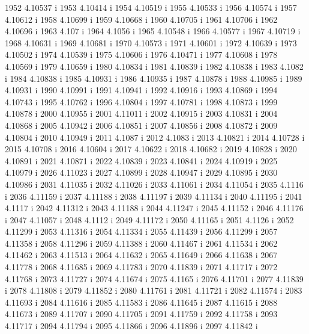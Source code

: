  1952  4.10537  i
 1953  4.10414  i
 1954  4.10519  i
 1955  4.10533  i
 1956  4.10574  i
 1957  4.10612  i
 1958  4.10699  i
 1959  4.10668  i
 1960  4.10705  i
 1961  4.10706  i
 1962  4.10696  i
 1963  4.107  i
 1964  4.1056  i
 1965  4.10548  i
 1966  4.10577  i
 1967  4.10719  i
 1968  4.10631  i
 1969  4.10681  i
 1970  4.10573  i
 1971  4.10601  i
 1972  4.10639  i
 1973  4.10502  i
 1974  4.10539  i
 1975  4.10606  i
 1976  4.10471  i
 1977  4.10608  i
 1978  4.10569  i
 1979  4.10659  i
 1980  4.10834  i
 1981  4.10839  i
 1982  4.10838  i
 1983  4.1082  i
 1984  4.10838  i
 1985  4.10931  i
 1986  4.10935  i
 1987  4.10878  i
 1988  4.10985  i
 1989  4.10931  i
 1990  4.10991  i
 1991  4.10941  i
 1992  4.10916  i
 1993  4.10869  i
 1994  4.10743  i
 1995  4.10762  i
 1996  4.10804  i
 1997  4.10781  i
 1998  4.10873  i
 1999  4.10878  i
 2000  4.10955  i
 2001  4.11011  i
 2002  4.10915  i
 2003  4.10831  i
 2004  4.10868  i
 2005  4.10942  i
 2006  4.10851  i
 2007  4.10856  i
 2008  4.10872  i
 2009  4.10804  i
 2010  4.10949  i
 2011  4.1087  i
 2012  4.1083  i
 2013  4.10821  i
 2014  4.10728  i
 2015  4.10708  i
 2016  4.10604  i
 2017  4.10622  i
 2018  4.10682  i
 2019  4.10828  i
 2020  4.10891  i
 2021  4.10871  i
 2022  4.10839  i
 2023  4.10841  i
 2024  4.10919  i
 2025  4.10979  i
 2026  4.11023  i
 2027  4.10899  i
 2028  4.10947  i
 2029  4.10895  i
 2030  4.10986  i
 2031  4.11035  i
 2032  4.11026  i
 2033  4.11061  i
 2034  4.11054  i
 2035  4.1116  i
 2036  4.11159  i
 2037  4.11188  i
 2038  4.11197  i
 2039  4.11134  i
 2040  4.11195  i
 2041  4.1117  i
 2042  4.11312  i
 2043  4.11188  i
 2044  4.11247  i
 2045  4.11152  i
 2046  4.11176  i
 2047  4.11057  i
 2048  4.1112  i
 2049  4.11172  i
 2050  4.11165  i
 2051  4.1126  i
 2052  4.11299  i
 2053  4.11316  i
 2054  4.11334  i
 2055  4.11439  i
 2056  4.11299  i
 2057  4.11358  i
 2058  4.11296  i
 2059  4.11388  i
 2060  4.11467  i
 2061  4.11534  i
 2062  4.11462  i
 2063  4.11513  i
 2064  4.11632  i
 2065  4.11649  i
 2066  4.11638  i
 2067  4.11778  i
 2068  4.11685  i
 2069  4.11783  i
 2070  4.11839  i
 2071  4.11717  i
 2072  4.11768  i
 2073  4.11727  i
 2074  4.11674  i
 2075  4.1165  i
 2076  4.11701  i
 2077  4.11839  i
 2078  4.11808  i
 2079  4.11852  i
 2080  4.11761  i
 2081  4.11721  i
 2082  4.11574  i
 2083  4.11693  i
 2084  4.11616  i
 2085  4.11583  i
 2086  4.11645  i
 2087  4.11615  i
 2088  4.11673  i
 2089  4.11707  i
 2090  4.11705  i
 2091  4.11759  i
 2092  4.11758  i
 2093  4.11717  i
 2094  4.11794  i
 2095  4.11866  i
 2096  4.11896  i
 2097  4.11842  i
